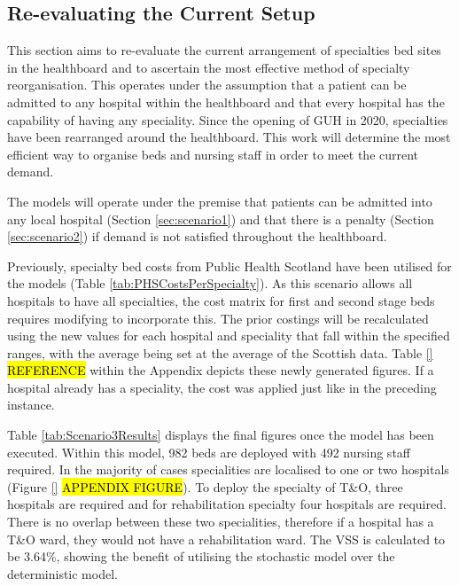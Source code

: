 \documentclass[../thesis.tex]{subfiles}
\begin{document}
\subsection{Re-evaluating the Current Setup}\label{sec:scenario3}
This section aims to re-evaluate the current arrangement of specialties bed sites in the healthboard and to ascertain the most effective method of specialty reorganisation. This operates under the assumption that a patient can be admitted to any hospital within the healthboard and that every hospital has the capability of having any speciality. Since the opening of GUH in 2020, specialties have been rearranged around the healthboard. This work will determine the most efficient way to organise beds and nursing staff in order to meet the current demand.

The models will operate under the premise that patients can be admitted into any local hospital (Section \ref{sec:scenario1}) and that there is a penalty (Section \ref{sec:scenario2}) if demand is not satisfied throughout the healthboard.

Previously, specialty bed costs from Public Health Scotland have been utilised for the models (Table \ref{tab:PHSCostsPerSpecialty}). %
As this scenario allows all hospitals to have all specialties, the cost matrix for first and second stage beds requires modifying to incorporate this. The prior costings will be recalculated using the new values for each hospital and speciality that fall within the specified ranges, with the average being set at the average of the Scottish data. Table \ref{} \hl{REFERENCE} within the Appendix depicts these newly generated figures. If a hospital already has a speciality, the cost was applied just like in the preceding instance.

Table \ref{tab:Scenario3Results} displays the final figures once the model has been executed. Within this model, 982 beds are deployed with 492 nursing staff required. In the majority of cases specialities are localised to one or two hospitals (Figure \ref{} \hl{APPENDIX FIGURE}). To deploy the specialty of T\&O, three hospitals are required and for rehabilitation specialty four hospitals are required. There is no overlap between these two specialities, therefore if a hospital has a T\&O ward, they would not have a rehabilitation ward. The VSS is calculated to be 3.64\%, showing the benefit of utilising the stochastic model over the deterministic model.
\end{document}
